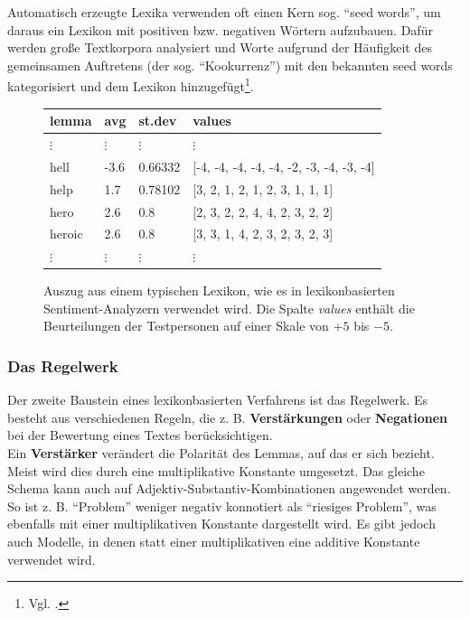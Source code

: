 \documentclass[
	a4paper,
	12pt,
	bibliography=totocnumbered,
	twoside,
]{scrreprt}
\begin{document}
Automatisch erzeugte Lexika verwenden oft einen Kern sog. "`seed words"', um daraus ein Lexikon mit positiven bzw. negativen Wörtern aufzubauen. Dafür werden große Textkorpora analysiert und Worte aufgrund der Häufigkeit des gemeinsamen Auftretens (der sog. "`Kookurrenz"') mit den bekannten seed words kategorisiert und dem Lexikon hinzugefügt\footnote{Vgl. \citet{kanayama2006}.}.\\


\begin{figure}[hbt!]
    \centering
    \begin{tabular}{| p{2cm} | p{2cm} | p{2cm} | p{8cm} |}
        \hline
        \rowcolor{tubs_blue_light60}
        \textbf{lemma} & \textbf{avg} & \textbf{st.dev} & \textbf{values} \\
        \hline
        $\vdots$ & $\vdots$ & $\vdots$ & $\vdots$ \\
        hell &  -3.6 & 0.66332 & [-4, -4, -4, -4, -4, -2, -3, -4, -3, -4] \\
        help & 1.7 & 0.78102 & [3, 2, 1, 2, 1, 2, 3, 1, 1, 1] \\
        hero & 2.6 & 0.8 & [2, 3, 2, 2, 4, 4, 2, 3, 2, 2] \\
        heroic & 2.6 & 0.8 & [3, 3, 1, 4, 2, 3, 2, 3, 2, 3] \\
        $\vdots$ & $\vdots$ & $\vdots$ & $\vdots$ \\
				\hline
    \end{tabular}

    \caption[Auszug aus dem Lexikon eines Sentiment-Analyzers]{Auszug aus einem typischen Lexikon, wie es in lexikonbasierten Sentiment-Analyzern verwendet wird. Die Spalte \textit{values} enthält die Beurteilungen der Testpersonen auf einer Skale von $+5$ bis $-5$\footnotemark.}
    \label{fig:lexicon}
\end{figure}


\subsubsection*{Das Regelwerk}
Der zweite Baustein eines lexikonbasierten Verfahrens ist das Regelwerk. Es besteht aus verschiedenen Regeln, die z. B. \textbf{Verstärkungen} oder \textbf{Negationen} bei der Bewertung eines Textes berücksichtigen.\\

Ein \textbf{Verstärker} verändert die Polarität des Lemmas, auf das er sich bezieht. Meist wird dies durch eine multiplikative Konstante umgesetzt. Das gleiche Schema kann auch auf Adjektiv-Substantiv-Kombinationen angewendet werden. So ist z. B. "`Problem"' weniger negativ konnotiert als "`riesiges Problem"', was ebenfalls mit einer multiplikativen Konstante dargestellt wird. Es gibt jedoch auch Modelle, in denen statt einer multiplikativen eine additive Konstante verwendet wird.\\
\end{document}
